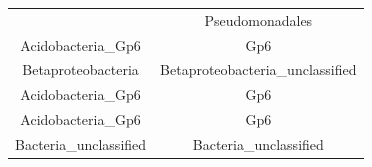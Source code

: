 \documentclass[]{article}
\begin{document}
\begin{longtable}[]{@{}cc@{}}
\begin{minipage}[t]{0.31\columnwidth}
\end{minipage} & \begin{minipage}[t]{0.43\columnwidth}\centering\strut
Pseudomonadales\strut
\end{minipage}\tabularnewline
\begin{minipage}[t]{0.31\columnwidth}\centering\strut
Acidobacteria\_Gp6\strut
\end{minipage} & \begin{minipage}[t]{0.43\columnwidth}\centering\strut
Gp6\strut
\end{minipage}\tabularnewline
\begin{minipage}[t]{0.31\columnwidth}\centering\strut
Betaproteobacteria\strut
\end{minipage} & \begin{minipage}[t]{0.43\columnwidth}\centering\strut
Betaproteobacteria\_unclassified\strut
\end{minipage}\tabularnewline
\begin{minipage}[t]{0.31\columnwidth}\centering\strut
Acidobacteria\_Gp6\strut
\end{minipage} & \begin{minipage}[t]{0.43\columnwidth}\centering\strut
Gp6\strut
\end{minipage}\tabularnewline
\begin{minipage}[t]{0.31\columnwidth}\centering\strut
Acidobacteria\_Gp6\strut
\end{minipage} & \begin{minipage}[t]{0.43\columnwidth}\centering\strut
Gp6\strut
\end{minipage}\tabularnewline
\begin{minipage}[t]{0.31\columnwidth}\centering\strut
Bacteria\_unclassified\strut
\end{minipage} & \begin{minipage}[t]{0.43\columnwidth}\centering\strut
Bacteria\_unclassified\strut
\end{minipage}\tabularnewline
\bottomrule
\end{longtable}
\end{document}
